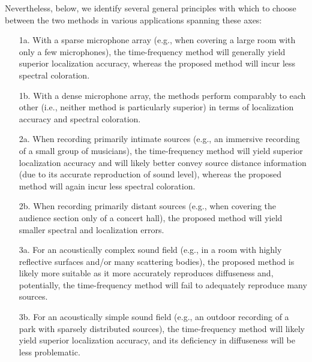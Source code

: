 Nevertheless, below, we identify several general principles with which to choose between the two methods in various applications spanning these axes:
\begin{enumerate}
\item[1a.] With a sparse microphone array (e.g., when covering a large room with only a few microphones), the time-frequency method will generally yield superior localization accuracy, whereas the proposed method will incur less spectral coloration.
\item[1b.] With a dense microphone array, the methods perform comparably to each other (i.e., neither method is particularly superior) in terms of localization accuracy and spectral coloration.
\item[2a.] When recording primarily intimate sources (e.g., an immersive recording of a small group of musicians), the time-frequency method will yield superior localization accuracy and will likely better convey source distance information (due to its accurate reproduction of sound level), whereas the proposed method will again incur less spectral coloration.
\item[2b.] When recording primarily distant sources (e.g., when covering the audience section only of a concert hall), the proposed method will yield smaller spectral and localization errors.
\item[3a.] For an acoustically complex sound field (e.g., in a room with highly reflective surfaces and/or many scattering bodies), the proposed method is likely more suitable as it more accurately reproduces diffuseness and, potentially, the time-frequency method will fail to adequately reproduce many sources.
\item[3b.] For an acoustically simple sound field (e.g., an outdoor recording of a park with sparsely distributed sources), the time-frequency method will likely yield superior localization accuracy, and its deficiency in diffuseness will be less problematic.
\end{enumerate}




